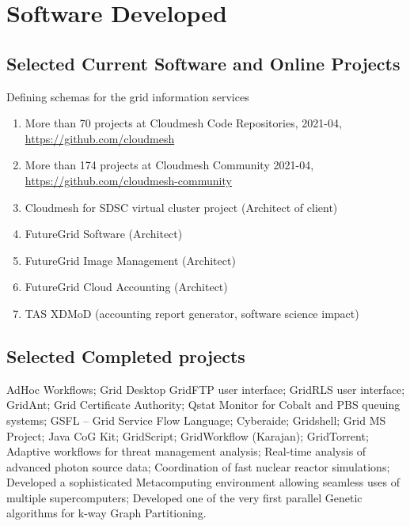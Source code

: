 \documentclass{article}
\begin{document}
\section{Software Developed}

\subsection{Selected Current Software and Online Projects}

\begin{refsegment}
  
  \nocite{las-2021-cybertraining-pub}  
  \nocite{las-2020-github-bookmanager}
  \nocite{las-2020-github-cloudmesh-community}
  \nocite{las-2020-github-cloudmesh}
  \nocite{las-2015-portal-futuresystems}
  
\end{refsegment}
Defining schemas for the grid information services
\pbib

\begin{enumerate}
\item  More than 70 projects at Cloudmesh Code Repositories, 2021-04, \url{https://github.com/cloudmesh}
\item  More than 174 projects at Cloudmesh Community 2021-04, \url{https://github.com/cloudmesh-community}
\item  Cloudmesh for SDSC virtual cluster project (Architect of client)
\item  FutureGrid Software (Architect)
\item  FutureGrid Image Management (Architect)
\item  FutureGrid Cloud Accounting (Architect)
\item  TAS  XDMoD (accounting report generator,  software science impact)
\end{enumerate}


\subsection{Selected Completed projects} 

AdHoc Workflows; Grid Desktop   GridFTP user interface; GridRLS user interface; GridAnt; Grid Certificate Authority; Qstat Monitor for Cobalt and PBS queuing systems; GSFL – Grid Service Flow Language; Cyberaide; Gridshell; Grid MS Project; Java CoG Kit; GridScript; GridWorkflow (Karajan); GridTorrent; Adaptive workflows for threat management analysis; Real-time analysis of advanced photon source data; Coordination of fast nuclear reactor simulations; Developed a sophisticated Metacomputing environment allowing seamless uses of multiple supercomputers; Developed one of the very first parallel Genetic algorithms for k-way Graph Partitioning. 


\end{document}
